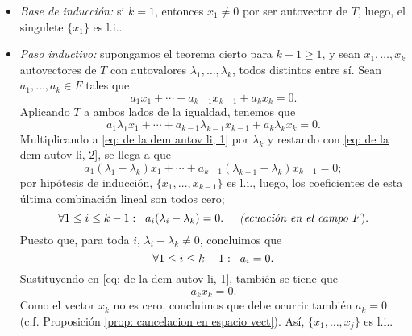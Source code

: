 \begin{itemize}
	\item \textit{Base de inducción:} si $k=1$, entonces $x_{1} \neq 0$
	por ser autovector de $T$, luego, el singulete $\{ x_{1} \}$
	es l.i..
	\item \textit{Paso inductivo: } supongamos el teorema cierto para 
	$k - 1 \geq 1$, y sean $x_{1}, \ldots , x_{k}$ autovectores de $T$
	con autovalores $\lambda_{1}, \ldots , \lambda_{k}$, todos distintos entre sí.
	Sean $a_{1}, \ldots , a_{k} \in F$ tales que 
	\begin{equation}
		\label{eq: de la dem autov li, 1}
		a_{1}x_{1} + \cdots + a_{k-1}x_{k-1} + a_{k} x_{k} = 0.
	\end{equation}
	Aplicando $T$ a ambos lados de la igualdad, tenemos que 
	\begin{equation}
		\label{eq: de la dem autov li, 2}
		a_{1}\lambda_{1}x_{1} + \cdots + a_{k-1}
		\lambda_{k-1}x_{k-1} + a_{k} \lambda_{k} x_{k} = 0.
	\end{equation}
	Multiplicando a \eqref{eq: de la dem autov li, 1}
	por $\lambda_{k}$ y restando con \eqref{eq: de la dem autov li, 2},
	se llega a que 
	\[
	a_{1}(\lambda_{1} - \lambda_{k}) x_{1} + \cdots + 
	a_{k-1}(\lambda_{k-1} - \lambda_{k}) x_{k-1} = 0;  
	\]
	por hipótesis de inducción, $\{ x_{1}, \ldots , x_{k-1} \}$ es l.i.,
	luego, los coeficientes de esta última combinación lineal son todos 
	cero;
	\[
	\forall 1 \leq i \leq k-1 : \hspace{0.2cm} a_{i} (\lambda_{i} - \lambda_{k}) = 0.
	\hspace{0.5cm} \textit{(ecuación en el campo } F).
	\]
	Puesto que, para toda $i$, $\lambda_{i} - \lambda_{k} \neq 0$, 
	concluimos que 
	\[
	\forall 1 \leq i \leq k-1 : \hspace{0.2cm} a_{i} = 0.
	\]
	Sustituyendo en 
	\eqref{eq: de la dem autov li, 1}, también se tiene que 
	\[
	a_{k} x_{k} = 0.
	\]
	Como el vector $x_{k}$ no es cero, concluimos que debe ocurrir también
	$a_{k} = 0$ (c.f. Proposición 
	\ref{prop: cancelacion en espacio vect}). Así, 
	$\{x_{1}, \ldots, x_{j}\}$ es l.i..
\end{itemize}

\QEDB
\vspace{0.2cm}


